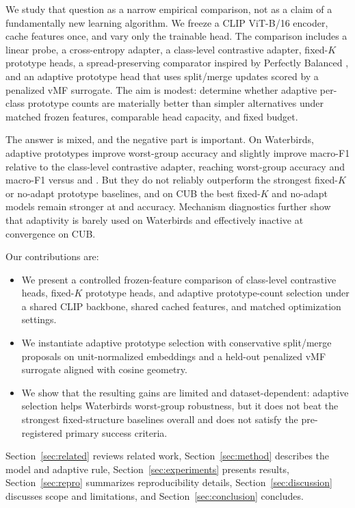 \documentclass[10pt,twocolumn]{article}
\begin{document}
We study that question as a narrow empirical comparison, not as a claim of a fundamentally new learning algorithm. We freeze a CLIP ViT-B/16 encoder, cache features once, and vary only the trainable head. The comparison includes a linear probe, a cross-entropy adapter, a class-level contrastive adapter, fixed-$K$ prototype heads, a spread-preserving comparator inspired by Perfectly Balanced \citep{chen2022Perfectly}, and an adaptive prototype head that uses split/merge updates scored by a penalized vMF surrogate. The aim is modest: determine whether adaptive per-class prototype counts are materially better than simpler alternatives under matched frozen features, comparable head capacity, and fixed budget.

The answer is mixed, and the negative part is important. On Waterbirds, adaptive prototypes improve worst-group accuracy and slightly improve macro-F1 relative to the class-level contrastive adapter, reaching \WbAdaptiveWorst{} worst-group accuracy and \WbAdaptiveMacroFOne{} macro-F1 versus \WbContrastiveWorst{} and \WbContrastiveMacroFOne{}. But they do not reliably outperform the strongest fixed-$K$ or no-adapt prototype baselines, and on CUB the best fixed-$K$ and no-adapt models remain stronger at \CubFixedKAcc{} and \CubNoAdaptAcc{} accuracy. Mechanism diagnostics further show that adaptivity is barely used on Waterbirds and effectively inactive at convergence on CUB.

Our contributions are:
\begin{itemize}[leftmargin=1.5em]
  \item We present a controlled frozen-feature comparison of class-level contrastive heads, fixed-$K$ prototype heads, and adaptive prototype-count selection under a shared CLIP backbone, shared cached features, and matched optimization settings.
  \item We instantiate adaptive prototype selection with conservative split/merge proposals on unit-normalized embeddings and a held-out penalized vMF surrogate aligned with cosine geometry.
  \item We show that the resulting gains are limited and dataset-dependent: adaptive selection helps Waterbirds worst-group robustness, but it does not beat the strongest fixed-structure baselines overall and does not satisfy the pre-registered primary success criteria.
\end{itemize}

Section~\ref{sec:related} reviews related work, Section~\ref{sec:method} describes the model and adaptive rule, Section~\ref{sec:experiments} presents results, Section~\ref{sec:repro} summarizes reproducibility details, Section~\ref{sec:discussion} discusses scope and limitations, and Section~\ref{sec:conclusion} concludes.
\end{document}
